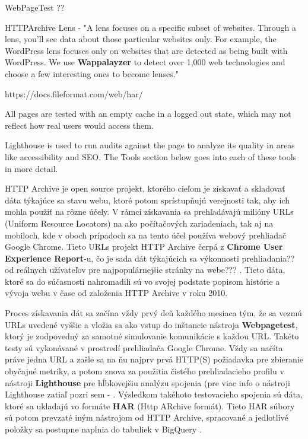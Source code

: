 WebPageTest ??

HTTPArchive Lens - "A lens focuses on a specific subset of websites. Through a lens, you'll see data about those particular websites only. For example, the WordPress lens focuses only on websites that are detected as being built with WordPress. We use \textbf{Wappalayzer} to detect over 1,000 web technologies and choose a few interesting ones to become lenses."

https://docs.fileformat.com/web/har/


All pages are tested with an empty cache in a logged out state, which may not reflect how real users would access them.

Lighthouse is used to run audits against the page to analyze its quality in areas like accessibility and SEO. The Tools section below goes into each of these tools in more detail.

HTTP Archive je open source projekt, ktorého cieľom je získavať a skladovať dáta 
týkajúce sa stavu webu, ktoré potom sprístupňujú verejnosti tak, aby ich mohla
použiť na rôzne účely. V rámci získavania sa prehľadávajú milióny URLs (Uniform 
Resource Locators) na ako počítačových zariadeniach, tak aj na mobiloch, kde v oboch prípadoch sa na tento účel používa webový prehliadač Google Chrome. 
 Tieto URLs projekt HTTP Archive čerpá z 
\textbf{Chrome User Experience Report}-u, čo je sada dát týkajúcich sa výkonnosti
prehliadania?? od reálnych užívateľov pre najpopulárnejšie stránky na webe???
. Tieto dáta, ktoré sa do súčasnosti nahromadili sú vo svojej podstate popisom histórie a vývoja webu v čase od založenia HTTP Archive v roku 2010.

Proces získavania dát sa začína vždy prvý deň každého mesiaca tým, že sa vezmú URLs uvedené vyššie a vložia sa ako vstup do inštancie nástroja 
\textbf{Webpagetest}, ktorý je zodpovedný za samotné simulovanie komunikácie s 
každou URL. Takéto testy sú vykonávané v prostredí prehliadača Google Chrome.
Vždy sa načíta práve jedna URL a zašle sa na ňu najprv prvá HTTP(S) požiadavka pre zbieranie obyčajné metriky, a potom znova za použitia čistého prehliadacieho profilu v nástroji \textbf{Lighthouse} pre hĺbkovejšiu analýzu spojenia (pre viac info o nástroji Lighthouse zatiaľ pozri sem - . Výsledkom takéhoto testovacieho spojenia sú dáta, ktoré sa ukladajú vo formáte \textbf{HAR} (Http ARchive formát). Tieto HAR súbory sú potom prevzaté iným nástrojom od HTTP Archive, spracované a jedlotlivé položky sa postupne naplnia do tabuliek v BigQuery .

